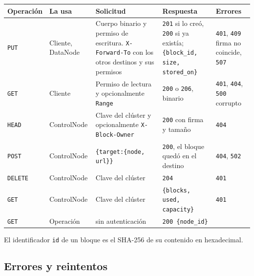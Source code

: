 \documentclass[10pt]{article}
\begin{document}
\begin{xltabular}{\linewidth}{@{}L{3.5cm}L{2.0cm}YYL{2.0cm}@{}}
\toprule
Operación & La usa & Solicitud & Respuesta & Errores \\
\midrule\endhead
\texttt{PUT}  & Cliente, DataNode & Cuerpo binario y permiso de escritura. \texttt{X-Forward-To} con los otros destinos y sus permisos & \texttt{201} si lo creó, \texttt{200} si ya existía; \texttt{\{block\_id, size, stored\_on\}} & \texttt{401}, \texttt{409} firma no coincide, \texttt{507} \\
\texttt{GET}  & Cliente & Permiso de lectura y opcionalmente \texttt{Range} & \texttt{200} o \texttt{206}, binario & \texttt{401}, \texttt{404}, \texttt{500} corrupto \\
\texttt{HEAD}  & ControlNode & Clave del clúster y opcionalmente \texttt{X-Block-Owner} & \texttt{200} con firma y tamaño & \texttt{404} \\
\texttt{POST}  & ControlNode & \texttt{\{target:\{node, url\}\}} & \texttt{200}, el bloque quedó en el destino & \texttt{404}, \texttt{502} \\
\texttt{DELETE}  & ControlNode & Clave del clúster & \texttt{204} & \texttt{401} \\
\texttt{GET}  & ControlNode & Clave del clúster & \texttt{\{blocks, used, capacity\}} & \texttt{401} \\
\texttt{GET}  & Operación & sin autenticación & \texttt{200 \{node\_id\}} & \\
\bottomrule
\end{xltabular}

El identificador \texttt{id} de un bloque es el SHA-256 de su contenido en hexadecimal.

\subsection{Errores y reintentos}
\end{document}
